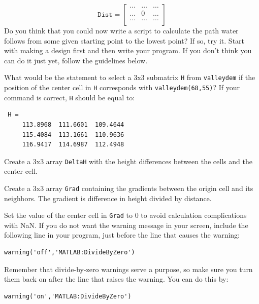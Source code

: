 \begin{equation}
\mathtt{Dist} = \left[
\begin{array}{ccc}
\ldots&\ldots&\ldots\\
\ldots&0&\ldots\\
\ldots&\ldots&\ldots\\
\end{array}
\right]
\end{equation}
Do you think that you could now write a script to calculate the path water follows from some given starting point to the lowest point? If so, try it. Start with making a design first and then write your program.
If you don't think you can do it just yet, follow the guidelines below.
\begin{action}
What would be the statement to select a 3x3 submatrix {\tt H} from {\tt valleydem} if the position of the center cell in {\tt H} corresponds with {\tt valleydem(68,55)}? If your command is correct, {\tt H} should be equal to:
\end{action}
\begin{verbatim}
 H =
     113.8968  111.6601  109.4644
     115.4084  113.1661  110.9636
     116.9417  114.6987  112.4948
\end{verbatim}
\begin{action}
Create a 3x3 array {\tt DeltaH} with the height differences between the cells and the center cell.
\end{action}
\begin{action}
Create a 3x3 array {\tt Grad} containing the gradients between the origin cell and its neighbors. The gradient is difference in height divided by distance. 
\end{action}
\begin{action}
Set the value of the center cell in {\tt Grad} to 0 to avoid calculation complications with NaN. If you do not want the warning message in your screen, include the following line in your program, just before the line that causes the warning:
\begin{lstlisting}[numbers=none]
warning('off','MATLAB:DivideByZero')
\end{lstlisting}
Remember that divide-by-zero warnings serve a purpose, so make sure you turn them back on after the line that raises the warning. You can do this by:
\begin{lstlisting}[numbers=none]
warning('on','MATLAB:DivideByZero')
\end{lstlisting}
\end{action}
